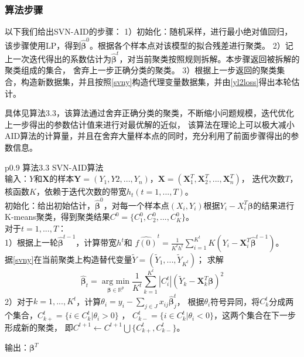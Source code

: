 \subsubsection{算法步骤}
以下我们给出SVN-AID的步骤：
1）初始化：随机采样，进行最小绝对值回归，该步骤使用LP，得到$\hat{\bm{\beta}}^0$。根据各个样本点对该模型的拟合残差进行聚类。
2）记上一次迭代得出的系数估计为$\hat{\bm{\beta}}^t$，对当前聚类按照规则拆解。本步骤返回被拆解的聚类组成的集合，
舍弃上一步正确分类的聚类。
3）根据上一步返回的聚类集合，构造新数据集，并且按照\eqref{svny}构造代理变量数据集，并由\eqref{yl2loss}得出本轮估计。

具体见算法3.3，该算法通过舍弃正确分类的聚类，不断缩小问题规模，迭代优化上一步得出的参数估计值来进行对最优解的近似，
该算法在理论上可以极大减小AID算法的计算量，并且在舍弃大量样本点的同时，充分利用了前面步骤得出的参数信息。

\begin{table}[H]%
    \centering%
    \begin{tabular}{{p{0.9\columnwidth}}}%
    \toprule%
    算法3.3 SVN-AID算法\\
    \midrule%
    输入：$Y$和$\bm{X}$的样本$\bm{Y} = (Y_1, Y2, ..., Y_n)$，$\bm{X} = (\bm{X}^T_1, \bm{X}^T_2, ..., \bm{X}^T_n)$，
    迭代次数$T$，核函数$K$，依赖于迭代次数的带宽$h_t(t = 1, ..., T)。$
    \\
    初始化：给出初始估计，$\hat{\bm{\beta}}^{0} $，对每一个样本点$(X_i, Y_i)$根据$Y_i - X_i^T\bm{\beta} $的结果进行
    K-means聚类，得到聚类结果$C^0 = \{C_1^0, C_2^0, ... , C_K^0\}$。
    \\
    对于$t = 1, ..., T$：\\
        1）根据上一轮$\hat{\bm{\beta}}^{t-1}$，计算带宽$h^t$和
        $\hat{f(0)}^t = \frac{1}{K^th^t}\sum_{i=1}^{K^t}K(Y_i - \bm{X}_i^T\hat{\bm{\beta}}^{t-1})$。\\
        据\eqref{svny}在当前聚类上构造替代变量$\tilde{Y} = (\tilde{Y}_1, ..., \tilde{Y}_{K^t})$；
        求解
        $$
            \hat{\bm{\beta}}_t = \underset{\bm{\beta} \in \mathbb{R}^{p}}{\operatorname{arg\ min}}
            \frac1{K^t} \sum_{k=1}^{K^t}|C_i^{t}|(\tilde{Y}_k - \bm{X}_k^T\bm{\beta})^2
        $$
        2）对于$k = 1, ..., K^t$，计算$\theta_i = y_i - \sum_{j \in J}x_{ij}\hat{\bm{\beta}}_j^t$，
        根据$\theta_i$符号异同，将$C^t_k$分成两个集合，$C_{k+}^t = \{i \in C_k^t | \theta_i > 0\}$ ，
        $C_{k-}^t = \{i \in C_k^t | \theta_i < 0\}$，这两个集合在下一步形成新的聚类，
        即$C^{t+1} \leftarrow C^{t+1}\bigcup \{ C_{k+}^t, C_{k-}^t\}$。 
        
        输出：$\bm{\beta}^{T}$
    \\
    \bottomrule%
    \end{tabular}
\end{table}%

